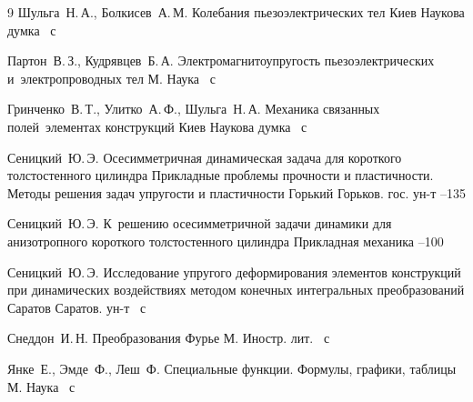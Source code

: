 \begin{thebibliography}{9}
\by Шульга~Н.\,А., Болкисев~А.\,М. 
\book Колебания пьезоэлектрических тел 
\publaddr Киев 
\publ Наукова думка
~с


\by Партон~В.\,З., Кудрявцев~Б.\,А. 
\book Электромагнитоупругость пьезоэлектрических и~электропроводных тел 
\publaddr М.
\publ Наука
~с

\by Гринченко~В.\,Т., Улитко~А.\,Ф., Шульга~Н.\,А.
\book Механика связанных полей~элементах конструкций 
\publaddr Киев
\publ Наукова думка
~с


\by Сеницкий~Ю.\,Э.
\paper Осесимметричная динамическая задача для короткого толстостенного цилиндра
\inbook Прикладные проблемы прочности и пластичности. Методы решения задач упругости и пластичности
\publaddr Горький
\publ Горьков. гос. ун-т
--135

\by Сеницкий~Ю.\,Э.
\paper К~решению осесимметричной задачи динамики для анизотропного короткого толстостенного цилиндра
\jour Прикладная механика
--100

\by Сеницкий~Ю.\,Э.
\book Исследование упругого деформирования элементов конструкций при динамических воздействиях методом конечных интегральных преобразований 
\publaddr Саратов
\publ Саратов. ун-т
~с

\by Снеддон~И.\,Н. 
\book Преобразования Фурье
\publaddr М.
\publ Иностр. лит.
~с

\by Янке~Е., Эмде~Ф., Леш~Ф. 
\book Специальные функции. Формулы, графики, таблицы 
\publaddr М.
\publ Наука
~с

\end{thebibliography}

\newpage




\makeengtitlem


%
